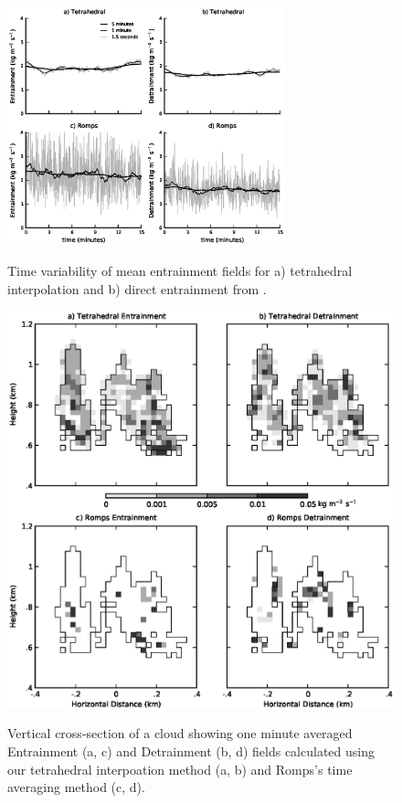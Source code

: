 \documentclass[12pt]{article}
\begin{document}
\begin{figure}[t]
  \noindent\includegraphics[width=19pc,angle=0]{./figures/averaging_convergence}\\ 
  \caption{Time variability of mean entrainment fields for a) tetrahedral 
  interpolation and b) direct entrainment from \cite{Romps2010}.
  }\label{fig:averaging_convergence}
\end{figure}

\begin{figure}[t]
  \noindent\includegraphics[width=39pc,angle=0]{./figures/spatial_variability_1min}\\ 
  \caption{Vertical cross-section of a cloud showing one minute averaged 
  Entrainment (a, c) and Detrainment (b, d) fields calculated using our 
  tetrahedral interpoation method (a, b) and Romps's time averaging method 
  (c, d).
  }\label{fig:spatial_variability}
\end{figure}
\end{document}

